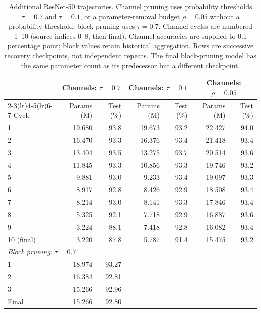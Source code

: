 \begin{table}[t]
  \caption{Additional ResNet-50 trajectories. Channel pruning uses
    probability thresholds $\tau=0.7$ and $\tau=0.1$, or a parameter-removal
    budget $\rho=0.05$ without a probability threshold; block pruning uses
    $\tau=0.7$. Channel cycles are numbered 1--10 (source indices 0--8,
    then final). Channel accuracies are supplied to 0.1 percentage point;
    block values retain historical aggregation. Rows are successive recovery
    checkpoints, not independent repeats. The final block-pruning model
    has the same parameter count as its predecessor but a different checkpoint.}
  \label{tab:resnet-notebook-trajectories}
  \centering
  \small
  \begin{tabular}{@{}lrrrrrr@{}}
    \toprule
    & \multicolumn{2}{c}{Channels: $\tau=0.7$}
    & \multicolumn{2}{c}{Channels: $\tau=0.1$}
    & \multicolumn{2}{c}{Channels: $\rho=0.05$} \\
    \cmidrule(lr){2-3}\cmidrule(lr){4-5}\cmidrule(lr){6-7}
    Cycle & Params (M) & Test (\%) & Params (M) & Test (\%) & Params (M) & Test (\%) \\
    \midrule
    1 & 19.680 & 93.8 & 19.673 & 93.2 & 22.427 & 94.0 \\
    2 & 16.470 & 93.3 & 16.376 & 93.4 & 21.418 & 93.4 \\
    3 & 13.404 & 93.5 & 13.275 & 93.7 & 20.514 & 93.6 \\
    4 & 11.845 & 93.3 & 10.856 & 93.3 & 19.746 & 93.2 \\
    5 & 9.881 & 93.0 & 9.233 & 93.4 & 19.097 & 93.3 \\
    6 & 8.917 & 92.8 & 8.426 & 92.9 & 18.508 & 93.4 \\
    7 & 8.214 & 93.0 & 8.141 & 93.3 & 17.846 & 93.4 \\
    8 & 5.325 & 92.1 & 7.718 & 92.9 & 16.887 & 93.6 \\
    9 & 3.224 & 88.1 & 7.418 & 92.8 & 16.082 & 93.4 \\
    10 (final) & 3.220 & 87.8 & 5.787 & 91.4 & 15.475 & 93.2 \\
    \midrule
    \multicolumn{7}{l}{\textit{Block pruning:} $\tau=0.7$} \\
    1 & 18.974 & 93.27 & & & & \\
    2 & 16.384 & 92.81 & & & & \\
    3 & 15.266 & 92.96 & & & & \\
    Final & 15.266 & 92.80 & & & & \\
    \bottomrule
  \end{tabular}
\end{table}


